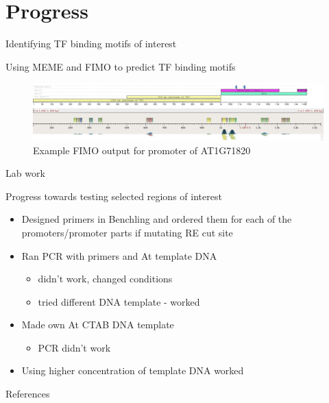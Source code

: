 \documentclass[t, aspectratio=169, allowframebreaks]{beamer}
\begin{document}
\section{Progress}
\label{sec:org6288a3f}

\begin{frame}[label={sec:orged2d939}]{Identifying TF binding motifs of interest}
\begin{block}{Using MEME and FIMO to predict TF binding motifs}
\begin{figure}[htbp]
\centering
\includegraphics[width=14cm]{./genes.png}
\caption{\label{fig:org0ae49aa}
Example FIMO output for promoter of AT1G71820}
\end{figure}
\end{block}
\end{frame}

\begin{frame}[label={sec:org5450446}]{Lab work}
\begin{block}{Progress towards testing selected regions of interest}
\begin{itemize}
\item Designed primers in Benchling and ordered them for each of the promoters/promoter parts if mutating RE cut site
\item Ran PCR with primers and At template DNA
\begin{itemize}
\item didn't work, changed conditions
\item tried different DNA template - worked
\end{itemize}
\item Made own At CTAB DNA template
\begin{itemize}
\item PCR didn’t work
\end{itemize}
\item Using higher concentration of template DNA worked
\end{itemize}
\end{block}
\end{frame}


\begin{frame}[allowframebreaks,label=]{References}


\end{frame}
\end{document}
